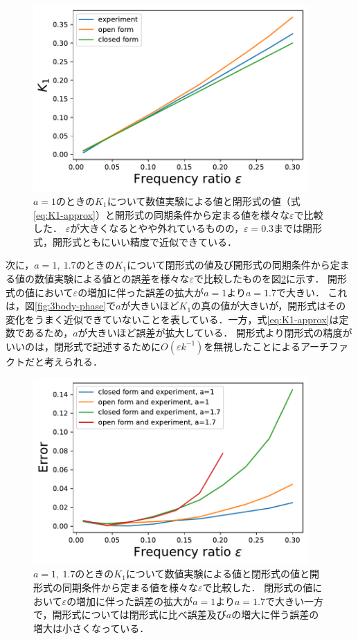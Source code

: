 \documentclass[../main]{subfiles}
\begin{document}
\begin{figure}[tbp]
\centering
\includegraphics[width=105mm]{./images/k1-compare.pdf}
\centering
\caption{$a=1$のときの$K_1$について数値実験による値と閉形式の値（式\eqref{eq:K1-approx}）と開形式の同期条件から定まる値を様々な$\varepsilon$で比較した．
$\varepsilon$が大きくなるとやや外れているものの，$\varepsilon=0.3$までは閉形式，開形式ともにいい精度で近似できている．}
\label{fig:k1-compare}
\end{figure}

次に，$a=1,\ 1.7$のときの$K_1$について閉形式の値及び開形式の同期条件から定まる値の数値実験による値との誤差を様々な$\varepsilon$で比較したものを図\ref{fig:k1-error}に示す．
開形式の値において$\varepsilon$の増加に伴った誤差の拡大が$a=1$より$a=1.7$で大きい．
これは，図\ref{fig:3body-phase}で$a$が大きいほど$K_1$の真の値が大きいが，開形式はその変化をうまく近似できていないことを表している．一方，式\eqref{eq:K1-approx}は定数であるため，$a$が大きいほど誤差が拡大している．
開形式より閉形式の精度がいいのは，閉形式で記述するために$O(\varepsilon k^{-1})$を無視したことによるアーチファクトだと考えられる．

\begin{figure}[tbp]
\centering
\includegraphics[width=105mm]{./images/k1-error.pdf}
\centering
\caption{$a=1,\ 1.7$のときの$K_1$について数値実験による値と閉形式の値と開形式の同期条件から定まる値を様々な$\varepsilon$で比較した．
閉形式の値において$\varepsilon$の増加に伴った誤差の拡大が$a=1$より$a=1.7$で大きい一方で，開形式については閉形式に比べ誤差及び$a$の増大に伴う誤差の増大は小さくなっている．}
\label{fig:k1-error}
\end{figure}
\end{document}
